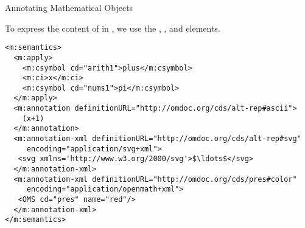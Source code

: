 \begin{omgroup}[id=annotating]{Annotating Mathematical Objects}
\begin{example}[id=semantics.ex]
  To express the content of  in \cmathml, we use the
  , , and
   elements.
\begin{lstlisting}[language=MathML,label=lst:semantics,mathescape,
                   caption={Associating Alternate Representations in \cmathml},
                   numbers=none,index={m:semantics,m:annotation-xml,m:annotation}]
<m:semantics>
  <m:apply>
    <m:csymbol cd="arith1">plus</m:csymbol>
    <m:ci>x</m:ci>
    <m:csymbol cd="nums1">pi</m:csymbol>
  </m:apply>
  <m:annotation definitionURL="http://omdoc.org/cds/alt-rep#ascii"> 
    (x+1)
  </m:annotation>
  <m:annotation-xml definitionURL="http://omdoc.org/cds/alt-rep#svg" 
     encoding="application/svg+xml">
   <svg xmlns='http://www.w3.org/2000/svg'>$\ldots$</svg>
  </m:annotation-xml>
  <m:annotation-xml definitionURL="http://omdoc.org/cds/pres#color" 
     encoding="application/openmath+xml"> 
   <OMS cd="pres" name="red"/>
  </m:annotation-xml>
</m:semantics>
\end{lstlisting}
\end{example}
\end{omgroup}

